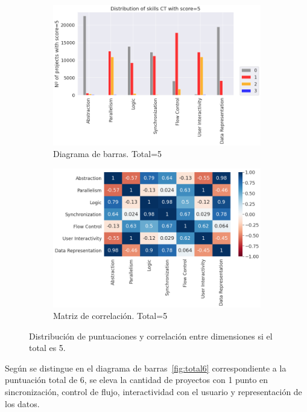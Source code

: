 \documentclass[a4paper, 12pt]{book}
\begin{document}
\begin{figure}[H]
    \centering
    \begin{subfigure}[h]{.49\textwidth} 
        \includegraphics[width=\textwidth]{img/distribucion_5_Scratch}
        \caption{Diagrama de barras. Total=5}
        \label{fig:total5}
    \end{subfigure}       
    \begin{subfigure}[h]{.49\textwidth} 
        \includegraphics[width=\textwidth]{img/corr_5_Scratch}
        \caption{Matriz de correlación. Total=5}
        \label{fig:corr5}
    \end{subfigure}
     \caption{Distribución de puntuaciones y correlación entre dimensiones si el total es 5.}
\end{figure}

Según se distingue en el diagrama de barras~\ref{fig:total6} correspondiente a la puntuación total de 6, se eleva la cantidad de proyectos con 1 punto en sincronización, control de flujo, interactividad con el usuario y representación de los datos.
\end{document}
